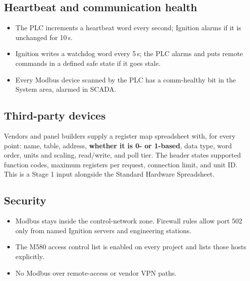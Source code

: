 \subsection*{Heartbeat and communication health}
\begin{itemize}[itemsep=2pt]
  \item The PLC increments a heartbeat word every second; Ignition alarms if it is unchanged for 10\,s.
  \item Ignition writes a watchdog word every 5\,s; the PLC alarms and puts remote commands in a defined safe state if it goes stale.
  \item Every Modbus device scanned by the PLC has a comm-healthy bit in the System area, alarmed in SCADA.
\end{itemize}

\subsection*{Third-party devices}
Vendors and panel builders supply a register map spreadsheet with, for every point: name, table, address, \textbf{whether it is 0- or 1-based}, data type, word order, units and scaling, read/write, and poll tier. The header states supported function codes, maximum registers per request, connection limit, and unit ID. This is a Stage 1 input alongside the Standard Hardware Spreadsheet.

\subsection*{Security}
\begin{itemize}[itemsep=2pt]
  \item Modbus stays inside the control-network zone. Firewall rules allow port 502 only from named Ignition servers and engineering stations.
  \item The M580 access control list is enabled on every project and lists those hosts explicitly.
  \item No Modbus over remote-access or vendor VPN paths.
\end{itemize}

